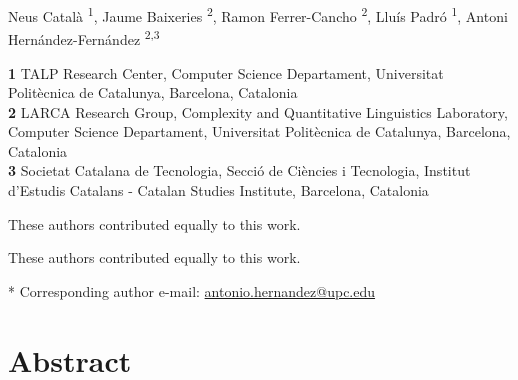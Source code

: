 \documentclass[10pt,letterpaper]{article}
\newif\ifarxiv
\begin{document}
\vspace*{0.2in}

\begin{flushleft}
{\Large
\textbf{} 
}
\newline

\ifarxiv

Neus Català \textsuperscript{1},
Jaume Baixeries \textsuperscript{2},
Ramon Ferrer-Cancho \textsuperscript{2},
Lluís Padró \textsuperscript{1},
Antoni Hernández-Fernández \textsuperscript{2,3 *}

\else


Neus Català \textsuperscript{1\Yinyang},
Jaume Baixeries \textsuperscript{2\ddag},
Ramon Ferrer-Cancho \textsuperscript{2\Yinyang},
Lluís Padró \textsuperscript{1\ddag},
Antoni Hernández-Fernández \textsuperscript{2,3\Yinyang *}

\fi

\textbf{1} TALP Research Center, Computer Science Departament, 
Universitat Politècnica de Catalunya, Barcelona, Catalonia
\\
\textbf{2} LARCA Research Group, Complexity and Quantitative Linguistics Laboratory, Computer Science Departament, Universitat Politècnica de Catalunya, Barcelona, Catalonia
\\
\textbf{3} Societat Catalana de Tecnologia, Secció de Ciències i Tecnologia, Institut d’Estudis Catalans - Catalan Studies Institute, Barcelona, Catalonia
\\

\bigskip

\ifarxiv

\else

\Yinyang These authors contributed equally to this work.

\ddag These authors contributed equally to this work.

\fi

* Corresponding author e-mail: \href{mailto:antonio.hernandez@upc.edu}{antonio.hernandez@upc.edu}

\end{flushleft}

\section*{Abstract}
\end{document}
